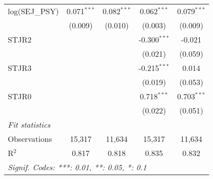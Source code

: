 \begin{tabular}{lcccc}
   log(SEJ\_PSY)      & 0.071$^{***}$ & 0.082$^{***}$ & 0.062$^{***}$  & 0.079$^{***}$\\   
                      & (0.009)       & (0.010)       & (0.003)        & (0.009)\\   
   STJR2              &               &               & -0.300$^{***}$ & -0.021\\   
                      &               &               & (0.021)        & (0.059)\\   
   STJR3              &               &               & -0.215$^{***}$ & 0.014\\   
                      &               &               & (0.019)        & (0.053)\\   
   STJR0              &               &               & 0.718$^{***}$  & 0.703$^{***}$\\   
                      &               &               & (0.022)        & (0.051)\\   
   \midrule
   \emph{Fit statistics}\\
   Observations       & 15,317        & 11,634        & 15,317         & 11,634\\  
   R$^2$              & 0.817         & 0.818         & 0.835          & 0.832\\  
   \midrule \midrule
   \multicolumn{5}{l}{\emph{Signif. Codes: ***: 0.01, **: 0.05, *: 0.1}}\\
\end{tabular}
\par\endgroup


